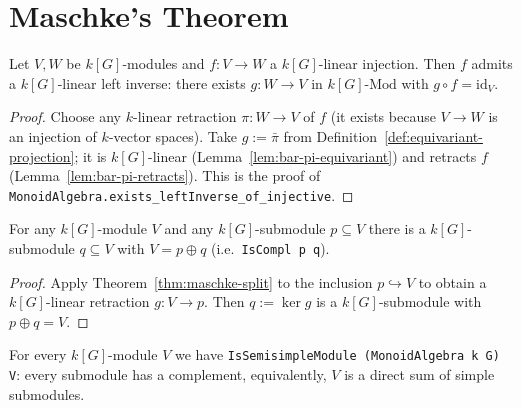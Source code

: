 \section{Maschke's Theorem}

\begin{theorem}
  \label{thm:maschke-split}
  \mathlibok
  Let $V, W$ be $k[G]$-modules and $f : V \to W$ a $k[G]$-linear injection.
  Then $f$ admits a $k[G]$-linear left inverse: there exists
  $g : W \to V$ in $k[G]\text{-Mod}$ with $g \circ f = \mathrm{id}_V$.
\end{theorem}

\begin{proof}
  \leanok
  Choose any $k$-linear retraction $\pi : W \to V$ of $f$ (it exists because
  $V \to W$ is an injection of $k$-vector spaces). Take
  $g := \bar\pi$ from Definition~\ref{def:equivariant-projection}; it is
  $k[G]$-linear (Lemma~\ref{lem:bar-pi-equivariant}) and retracts $f$
  (Lemma~\ref{lem:bar-pi-retracts}).  This is the proof of
  \texttt{MonoidAlgebra.exists\_leftInverse\_of\_injective}.
\end{proof}

\begin{theorem}
  \label{thm:maschke-compl}
  \mathlibok
  For any $k[G]$-module $V$ and any $k[G]$-submodule $p \subseteq V$ there is
  a $k[G]$-submodule $q \subseteq V$ with $V = p \oplus q$ (i.e.\
  \texttt{IsCompl p q}).
\end{theorem}

\begin{proof}
  \leanok
  Apply Theorem~\ref{thm:maschke-split} to the inclusion
  $p \hookrightarrow V$ to obtain a $k[G]$-linear retraction
  $g : V \to p$. Then $q := \ker g$ is a $k[G]$-submodule with $p \oplus q = V$.
\end{proof}

\begin{theorem}
  \label{thm:maschke-semisimple}
  \mathlibok
  For every $k[G]$-module $V$ we have
  \texttt{IsSemisimpleModule (MonoidAlgebra k G) V}: every submodule has a
  complement, equivalently, $V$ is a direct sum of simple submodules.
\end{theorem}

